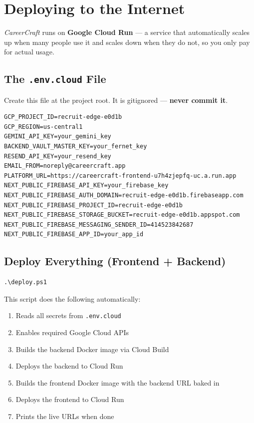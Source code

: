 \documentclass[12pt, a4paper]{report}
\newcommand{\cc}{\textit{CareerCraft}}
\newcommand{\filepath}[1]{\texttt{\small\color{ccpurpledk}#1}}
\begin{document}
\chapter{Deploying to the Internet}

\cc{} runs on \textbf{Google Cloud Run} --- a service that automatically scales
up when many people use it and scales down when they do not, so you only pay
for actual usage.

\section{The \texttt{.env.cloud} File}

Create this file at the project root.  It is gitignored --- \textbf{never commit it}.

\begin{lstlisting}[style=envstyle]
GCP_PROJECT_ID=recruit-edge-e0d1b
GCP_REGION=us-central1
GEMINI_API_KEY=your_gemini_key
BACKEND_VAULT_MASTER_KEY=your_fernet_key
RESEND_API_KEY=your_resend_key
EMAIL_FROM=noreply@careercraft.app
PLATFORM_URL=https://careercraft-frontend-u7h4zjepfq-uc.a.run.app
NEXT_PUBLIC_FIREBASE_API_KEY=your_firebase_key
NEXT_PUBLIC_FIREBASE_AUTH_DOMAIN=recruit-edge-e0d1b.firebaseapp.com
NEXT_PUBLIC_FIREBASE_PROJECT_ID=recruit-edge-e0d1b
NEXT_PUBLIC_FIREBASE_STORAGE_BUCKET=recruit-edge-e0d1b.appspot.com
NEXT_PUBLIC_FIREBASE_MESSAGING_SENDER_ID=414523842687
NEXT_PUBLIC_FIREBASE_APP_ID=your_app_id
\end{lstlisting}

\section{Deploy Everything (Frontend + Backend)}

\begin{lstlisting}[style=bashstyle]
.\deploy.ps1
\end{lstlisting}

This script does the following automatically:
\begin{enumerate}
  \item Reads all secrets from \filepath{.env.cloud}
  \item Enables required Google Cloud APIs
  \item Builds the backend Docker image via Cloud Build
  \item Deploys the backend to Cloud Run
  \item Builds the frontend Docker image with the backend URL baked in
  \item Deploys the frontend to Cloud Run
  \item Prints the live URLs when done
\end{enumerate}
\end{document}
